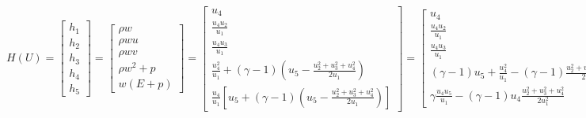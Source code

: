 \documentclass{article}
\begin{document}
\begin{equation}
  H(U) = \left[
    \begin{array}{c}
      h_1 \\
      h_2 \\
      h_3 \\
      h_4 \\
      h_5
    \end{array}
  \right] = \left[
    \begin{array}{c}
      \rho w\\
      \rho w u\\
      \rho w v\\
      \rho w^2 + p\\
      w(E+p)
    \end{array}
  \right] = \left[
    \begin{array}{c}
      u_4\\
      \frac{u_4 u_2}{u_1}\\
      \frac{u_4 u_3}{u_1}\\
      \frac{u_4^2}{u_1} + (\gamma-1) (u_5-\frac{u_2^2+u_3^2+u_4^2}{2u_1})\\
      \frac{u_4}{u_1} [ u_5 + (\gamma-1)(u_5-\frac{u_2^2+u_3^2+u_4^2}{2u_1}) ]
    \end{array}
  \right] = \left[
    \begin{array}{c}
      u_4\\
      \frac{u_4 u_2}{u_1}\\
      \frac{u_4 u_3}{u_1}\\
      (\gamma-1)u_5 + \frac{u_4^2}{u_1} - (\gamma-1)\frac{u_2^2+u_3^2+u_4^2}{2u_1}\\
      \gamma \frac{u_4 u_5}{u_1} - (\gamma-1) u_4 \frac{u_2^2+u_3^2+u_4^2}{2 u_1^2}
    \end{array}
  \right]
\end{equation}
\end{document}
